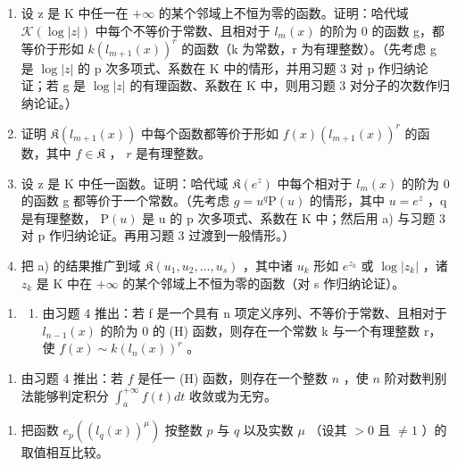 \begin{enumerate}
\def\labelenumi{\alph{enumi})}
\item
  设 z 是 K 中任一在 \(+\infty\) 的某个邻域上不恒为零的函数。证明：哈代域 \(\mathcal{K}(\log|z|)\) 中每个不等价于常数、且相对于 \(l_{m}(x)\) 的阶为 0 的函数 g，都等价于形如 \(k(l_{m+1}(x))^{r}\) 的函数（k 为常数，r 为有理整数）。（先考虑 g 是 \(\log|z|\) 的 p 次多项式、系数在 K 中的情形，并用习题 3 对 p 作归纳论证；若 g 是 \(\log|z|\) 的有理函数、系数在 K 中，则用习题 3 对分子的次数作归纳论证。）
\item
  证明 \(\mathfrak{K}(l_{m+1}(x))\) 中每个函数都等价于形如 \(f(x)(l_{m+1}(x))^r\) 的函数，其中 \(f \in \mathfrak{K}\) ， \(r\) 是有理整数。
\item
  设 z 是 K 中任一函数。证明：哈代域 \(\mathfrak{K}(e^{z})\) 中每个相对于 \(l_{m}(x)\) 的阶为 0 的函数 g 都等价于一个常数。（先考虑 \(g = u^{q} \mathrm{P}(u)\) 的情形，其中 \(u = e^{z}\) ，q 是有理整数， \(\mathrm{P}(u)\) 是 u 的 p 次多项式、系数在 K 中；然后用 a) 与习题 3 对 p 作归纳论证。再用习题 3 过渡到一般情形。）
\item
  把 a) 的结果推广到域 \(\mathfrak{K}(u_{1}, u_{2}, \ldots, u_{s})\) ，其中诸 \(u_{k}\) 形如 \(e^{z_{k}}\) 或 \(\log |z_{k}|\) ，诸 \(z_{k}\) 是 K 中在 \(+\infty\) 的某个邻域上不恒为零的函数（对 s 作归纳论证）。
\end{enumerate}

\begin{enumerate}
\def\labelenumi{\arabic{enumi})}
\setcounter{enumi}{4}
\tightlist
\item
  \begin{enumerate}
  \def\labelenumii{\alph{enumii})}
  \tightlist
  \item
    由习题 4 推出：若 f 是一个具有 n 项定义序列、不等价于常数、且相对于 \(l_{n-1}(x)\) 的阶为 0 的 (H) 函数，则存在一个常数 k 与一个有理整数 r，使 \(f(x) \sim k(l_n(x))^r\) 。
  \end{enumerate}
\end{enumerate}

\begin{enumerate}
\def\labelenumi{\alph{enumi})}
\setcounter{enumi}{1}
\tightlist
\item
  由习题 4 推出：若 \(f\) 是任一 (H) 函数，则存在一个整数 \(n\) ，使 \(n\) 阶对数判别法能够判定积分 \(\int_{a}^{+\infty} f(t) dt\) 收敛或为无穷。
\end{enumerate}

\begin{enumerate}
\def\labelenumi{\arabic{enumi})}
\setcounter{enumi}{5}
\tightlist
\item
  把函数 \(e_p\left((l_q(x))^{\mu}\right)\) 按整数 \(p\) 与 \(q\) 以及实数 \(\mu\) （设其 \(> 0\) 且 \(\neq 1\) ）的取值相互比较。
\end{enumerate}

